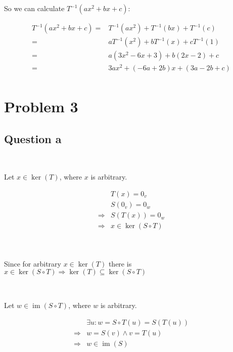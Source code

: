 \documentclass{article}
\DeclareMathOperator{\im}{im}
\begin{document}
So we can calculate $T^{-1}(ax^2+bx+c)$:

\begin{equation*}
\begin{split}
T^{-1}(ax^2+bx+c)=&T^{-1}(ax^2)+T^{-1}(bx)+T^{-1}(c)\\
=&aT^{-1}(x^2)+bT^{-1}(x)+cT^{-1}(1)\\
=&a(3x^2-6x+3)+b(2x-2)+c\\
=&3ax^2+(-6a+2b)x+(3a-2b+c)\\
\end{split}
\end{equation*}

\newpage

\section{Problem 3}
\subsection{Question a}

~

Let $x\in \ker(T)$, where $x$ is arbitrary.

\begin{equation*}
\begin{split}
&T(x)=0_v\\
&S(0_v)=0_w\\
\Rightarrow & S(T(x))=0_w\\
\Rightarrow &x \in \ker(S\circ T)\\
\end{split}
\end{equation*}

~

Since for arbitrary $x\in \ker(T)$ there is $x\in \ker(S\circ T) \Rightarrow \ker(T) \subseteq \ker(S\circ T)$

~

Let $w\in \im (S\circ T)$, where $w$ is arbitrary.

\begin{equation*}
\begin{split}
&\exists u : w=S\circ T(u)=S(T(u))\\
\Rightarrow &w=S(v) \land v=T(u)\\
\Rightarrow &w\in\im(S)\\
\end{split}
\end{equation*}

~
\end{document}
